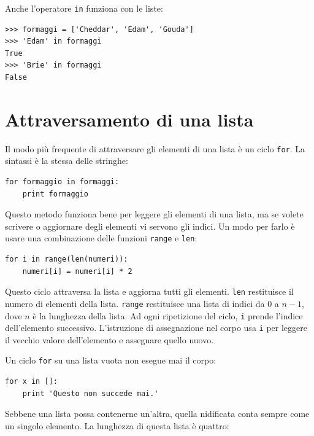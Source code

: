 \documentclass[10pt]{book}
\begin{document}

Anche l'operatore {\tt in} funziona con le liste:

\begin{verbatim}
>>> formaggi = ['Cheddar', 'Edam', 'Gouda']
>>> 'Edam' in formaggi
True
>>> 'Brie' in formaggi
False
\end{verbatim}


\section{Attraversamento di una lista}

Il modo più frequente di attraversare gli elementi di una lista è un ciclo {\tt for}. La sintassi è la stessa delle stringhe:

\begin{verbatim}
for formaggio in formaggi:
    print formaggio
\end{verbatim}
%
Questo metodo funziona bene per leggere gli elementi di una lista, ma se volete scrivere o aggiornare degli elementi vi servono gli indici. Un modo per farlo è usare una combinazione delle funzioni {\tt range} e {\tt len}:

\begin{verbatim}
for i in range(len(numeri)):
    numeri[i] = numeri[i] * 2
\end{verbatim}
%
Questo ciclo attraversa la lista e aggiorna tutti gli elementi. {\tt len}
restituisce il numero di elementi della lista.  {\tt range} restituisce una lista di indici da 0 a $n-1$, dove $n$ è la lunghezza della lista. Ad ogni ripetizione del ciclo, {\tt i} prende l'indice dell'elemento successivo. L'istruzione di assegnazione nel corpo usa {\tt i} per leggere il vecchio valore dell'elemento e assegnare quello nuovo.

Un ciclo {\tt for} su una lista vuota non esegue mai il corpo:

\begin{verbatim}
for x in []:
    print 'Questo non succede mai.'
\end{verbatim}
%
Sebbene una lista possa contenerne un'altra, quella nidificata conta sempre come un singolo elemento. La lunghezza di questa lista è quattro:
\end{document}
